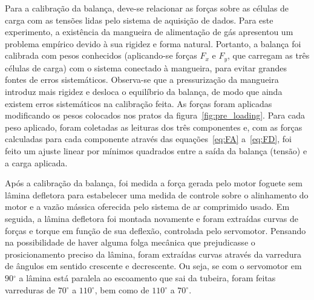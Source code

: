 Para a calibração da balança, deve-se relacionar as forças sobre as células de carga com as tensões lidas pelo sistema de aquisição de dados. Para este experimento, a existência da mangueira de alimentação de gás apresentou um problema empírico devido à sua rigidez e forma natural. Portanto, a balança foi calibrada com pesos conhecidos (aplicando-se forças \(F_x\) e \(F_y\), que carregam as três células de carga) com o sistema conectado à mangueira, para evitar grandes fontes de erros sistemáticos. Observa-se que a pressurização da mangueira introduz mais rigidez e desloca o equilíbrio da balança, de modo que ainda existem erros sistemáticos na calibração feita. As forças foram aplicadas modificando os pesos colocados nos pratos da figura~\ref{fig:pre_loading}. Para cada peso aplicado, foram coletadas as leituras dos três componentes e, com as forças calculadas para cada componente através das equações~\ref{eq:FA} a~\ref{eq:FD}, foi feito um ajuste linear por mínimos quadrados entre a saída da balança (tensão) e a carga aplicada.

Após a calibração da balança, foi medida a força gerada pelo motor foguete sem lâmina defletora para estabelecer uma medida de controle sobre o alinhamento do motor e a vazão mássica oferecida pelo sistema de ar comprimido usado. Em seguida, a lâmina defletora foi montada novamente e foram extraídas curvas de forças e torque em função de sua deflexão, controlada pelo servomotor. Pensando na possibilidade de haver alguma folga mecânica que prejudicasse o prosicionamento preciso da lâmina, foram extraídas curvas através da varredura de ângulos em sentido crescente e decrescente. Ou seja, se com o servomotor em \(90\mathrm{^\circ}\) a lâmina está paralela ao escoamento que sai da tubeira, foram feitas varreduras de \(70\mathrm{^\circ}\) a \(110\mathrm{^\circ}\), bem como de \(110\mathrm{^\circ}\) a \(70\mathrm{^\circ}\).